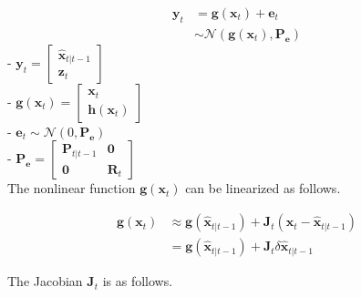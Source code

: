 \documentclass[10pt]{article}
\begin{document}
\begin{equation} 
	\boxed{ \begin{aligned} 
			\mathbf{y}_{t} & = \mathbf{g}(\mathbf{x}_{t}) + \mathbf{e}_{t} \\ 
			& \sim \mathcal{N}(\mathbf{g}(\mathbf{x}_{t}), \mathbf{P}_{\mathbf{e}})
	\end{aligned} }
\end{equation}
- $\mathbf{y}_{t} = \begin{bmatrix} \hat{\mathbf{x}}_{t|t-1} \\ \mathbf{z}_{t} \end{bmatrix}$\\
- $\mathbf{g}(\mathbf{x}_{t}) = \begin{bmatrix} \mathbf{x}_{t} \\ \mathbf{h}(\mathbf{x}_{t}) \end{bmatrix}$\\
- $\mathbf{e}_{t} \sim \mathcal{N}(0, \mathbf{P}_{\mathbf{e}})$\\
- $\mathbf{P}_{\mathbf{e}} = \begin{bmatrix} \mathbf{P}_{t|t-1} & \mathbf{0} \\ \mathbf{0} & \mathbf{R}_{t} \end{bmatrix}$\\

The nonlinear function $\mathbf{g}(\mathbf{x}_{t})$ can be linearized as follows.

\begin{equation} 
	\begin{aligned} 
		\mathbf{g}(\mathbf{x}_{t}) & \approx \mathbf{g}(\hat{\mathbf{x}}_{t|t-1}) + \mathbf{J}_{t}(\mathbf{x}_{t} - \hat{\mathbf{x}}_{t|t-1})  \\
		& = \mathbf{g}(\hat{\mathbf{x}}_{t|t-1}) + \mathbf{J}_{t}\delta \hat{\mathbf{x}}_{t|t-1} 
	\end{aligned} 
\end{equation}

The Jacobian $\mathbf{J}_{t}$ is as follows.
\end{document}
